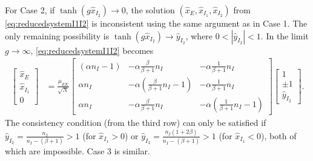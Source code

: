\documentclass[reqno]{siamonline190516}
\begin{document}
For Case 2, if $\tanh( g \hat{x}_{I_2} ) \rightarrow 0$, the solution $(\hat{x}_E, \hat{x}_{I_1}, \hat{x}_{I_2})$ from \cref{eq:reducedsystemI1I2} is inconsistent using the same argument as in Case 1. The only remaining possibility is $\tanh( g \hat{x}_{I_2} ) \rightarrow \hat{y}_{I_2}$, where $0 < |\hat{y}_{I_2}| < 1$. In the limit $g \rightarrow \infty$, \cref{eq:reducedsystemI1I2} becomes
\begin{equation*}
 \begin{aligned}
 \begin{bmatrix} \hat{x}_E \\ \hat{x}_{I_1} \\ 0 \end{bmatrix} 
 &= \frac{\mu_{EE}}{\sqrt{N}} 
 \begin{bmatrix} (\alpha n_I - 1) & -\alpha \frac{\beta}{\beta+1} n_I & - \alpha \frac{1}{\beta+1} n_I  \\
    \alpha n_I  & -\alpha \left(\frac{\beta}{\beta+1} n_I-1\right) & - \alpha \frac{1}{\beta+1} n_I  \\
    \alpha n_I & -\alpha \frac{\beta}{\beta+1} n_I & -\alpha \left(\frac{1}{\beta+1} n_I-1\right)
 \end{bmatrix}
 \begin{bmatrix} 1 \\ \pm 1 \\ \hat{y}_{I_2} \end{bmatrix}.
 \end{aligned}
 \end{equation*}
The consistency condition (from the third row) can only be satisfied if $\hat{y}_{I_2} = \frac{n_I}{n_I - (\beta + 1)} > 1$ (for $\hat{x}_{I_1} > 0$) or $\hat{y}_{I_2} = \frac{n_I(1 + 2 \beta)}{n_I - (\beta + 1)} > 1$ (for $\hat{x}_{I_1} < 0$), both of which are impossible. Case 3 is similar.
\end{document}
